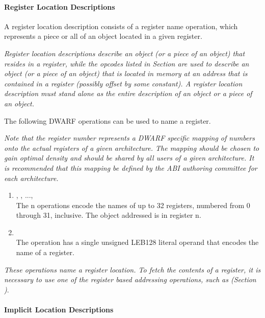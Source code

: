 \paragraph{Register Location Descriptions}

A register location description consists of a register name
operation, which represents a piece or all of an object
located in a given register.

\textit{Register location descriptions describe an object
(or a piece of an object) that resides in a register, while
the opcodes listed in 
Section 
are used to describe an object (or a piece of
an object) that is located in memory at an address that is
contained in a register (possibly offset by some constant). A
register location description must stand alone as the entire
description of an object or a piece of an object.
}

The following DWARF operations can be used to name a register.


\textit{Note that the register number represents a DWARF specific
mapping of numbers onto the actual registers of a given
architecture. The mapping should be chosen to gain optimal
density and should be shared by all users of a given
architecture. It is recommended that this mapping be defined
by the ABI authoring committee for each architecture.
}
\begin{enumerate}[1]
\item {}, , ...,  \\
The n operations encode the names of up to 32
registers, numbered from 0 through 31, inclusive. The object
addressed is in register n.

\item {} \\
The  operation has a single unsigned LEB128 literal
operand that encodes the name of a register.  
\end{enumerate}

\textit{These operations name a register location. To
fetch the contents of a register, it is necessary to use
one of the register based addressing operations, such as
(Section )}.


\paragraph{Implicit Location Descriptions}

